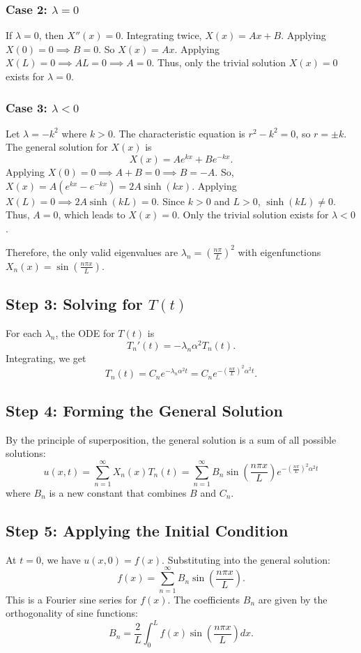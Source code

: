 \documentclass{article}
\begin{document}
	\subsubsection*{Case 2: $\lambda = 0$}
	If $\lambda = 0$, then $X''(x) = 0$. Integrating twice, $X(x) = Ax + B$.
	Applying $X(0)=0 \implies B=0$. So $X(x) = Ax$.
	Applying $X(L)=0 \implies AL=0 \implies A=0$.
	Thus, only the trivial solution $X(x)=0$ exists for $\lambda=0$.
	
	\subsubsection*{Case 3: $\lambda < 0$}
	Let $\lambda = -k^2$ where $k > 0$. The characteristic equation is $r^2 - k^2 = 0$, so $r = \pm k$.
	The general solution for $X(x)$ is
	$$ X(x) = A e^{kx} + B e^{-kx}. $$
	Applying $X(0)=0 \implies A+B=0 \implies B=-A$.
	So, $X(x) = A(e^{kx} - e^{-kx}) = 2A \sinh(kx)$.
	Applying $X(L)=0 \implies 2A \sinh(kL) = 0$. Since $k>0$ and $L>0$, $\sinh(kL) \neq 0$. Thus, $A=0$, which leads to $X(x)=0$.
	Only the trivial solution exists for $\lambda < 0$.
	
	Therefore, the only valid eigenvalues are $\lambda_n = \left(\frac{n\pi}{L}\right)^2$ with eigenfunctions $X_n(x) = \sin\left(\frac{n\pi x}{L}\right)$.
	
	\subsection*{Step 3: Solving for $T(t)$}
	For each $\lambda_n$, the ODE for $T(t)$ is
	$$ T_n'(t) = -\lambda_n \alpha^2 T_n(t). $$
	Integrating, we get
	$$ T_n(t) = C_n e^{-\lambda_n \alpha^2 t} = C_n e^{-\left(\frac{n\pi}{L}\right)^2 \alpha^2 t}. $$
	
	\subsection*{Step 4: Forming the General Solution}
	By the principle of superposition, the general solution is a sum of all possible solutions:
	$$ u(x,t) = \sum_{n=1}^{\infty} X_n(x)T_n(t) = \sum_{n=1}^{\infty} B_n \sin\left(\frac{n\pi x}{L}\right) e^{-\left(\frac{n\pi}{L}\right)^2 \alpha^2 t} $$
	where $B_n$ is a new constant that combines $B$ and $C_n$.
	
	\subsection*{Step 5: Applying the Initial Condition}
	At $t=0$, we have $u(x,0) = f(x)$. Substituting into the general solution:
	$$ f(x) = \sum_{n=1}^{\infty} B_n \sin\left(\frac{n\pi x}{L}\right). $$
	This is a Fourier sine series for $f(x)$. The coefficients $B_n$ are given by the orthogonality of sine functions:
	$$ B_n = \frac{2}{L} \int_0^L f(x) \sin\left(\frac{n\pi x}{L}\right) dx. $$
	
\end{document}
